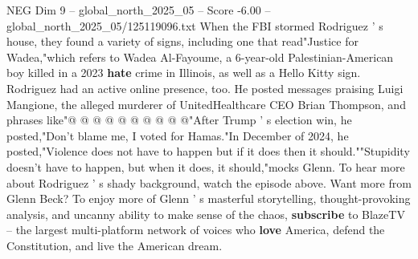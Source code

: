 \begin{textsample}{NEG Dim 9 – global\_north\_2025\_05 – Score -6.00 – global\_north\_2025\_05/125119096.txt}
When the FBI stormed Rodriguez ' s house, they found a variety of signs, including one that read"Justice for Wadea,"which refers to Wadea Al-Fayoume, a 6-year-old Palestinian-American boy killed in a 2023 \textbf{hate} crime in Illinois, as well as a Hello Kitty sign.
Rodriguez had an active online presence, too.
He posted messages praising Luigi Mangione, the alleged murderer of UnitedHealthcare CEO Brian Thompson, and phrases like"@ @ @ @ @ @ @ @ @ @"After Trump ' s election win, he posted,"Don't blame me, I voted for Hamas."In December of 2024, he posted,"Violence does not have to happen but if it does then it should.""Stupidity doesn't have to happen, but when it does, it should,"mocks Glenn.
To hear more about Rodriguez ' s shady background, watch the episode above.
Want more from Glenn Beck?
To enjoy more of Glenn ' s masterful storytelling, thought-provoking analysis, and uncanny ability to make sense of the chaos, \textbf{subscribe} to BlazeTV -- the largest multi-platform network of voices who \textbf{love} America, defend the Constitution, and live the American dream.

\end{textsample}
